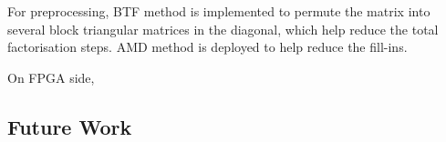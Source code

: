 \documentclass[11pt,a4paper]{article}
\begin{document}
For preprocessing, BTF method is implemented to permute the matrix into several block triangular matrices in the diagonal, which help reduce the total factorisation steps. AMD method is deployed to help reduce the fill-ins.

On FPGA side,

\subsection{Future Work}

\begin{sloppypar}
  \relax
  \renewcommand*{\bibname}{References}
  \printbibliography[heading=bibintoc,title={References}]
\end{sloppypar}
\end{document}
